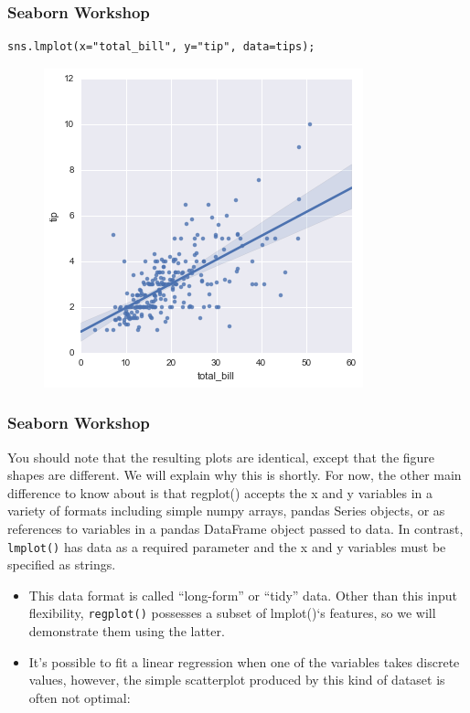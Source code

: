 \documentclass{beamer}
\begin{document}
\begin{frame}[fragile]
	\frametitle{Seaborn Workshop}
	\large
\begin{verbatim}
sns.lmplot(x="total_bill", y="tip", data=tips);
\end{verbatim}
\begin{figure}
	\centering
	\includegraphics[width=0.7\linewidth]{images/regression_10_0}
\end{figure}
\end{frame}
\begin{frame}[fragile]
	\frametitle{Seaborn Workshop}
	\large
You should note that the resulting plots are identical, except that the figure shapes are different. We will explain why this is shortly. For now, the other main difference to know about is that regplot() accepts the x and y variables in a variety of formats including simple numpy arrays, pandas Series objects, or as references to variables in a pandas DataFrame object passed to data. In contrast, \texttt{lmplot()} has data as a required parameter and the x and y variables must be specified as strings. 

\end{frame}
\begin{frame}[fragile]
	\large
	
\begin{itemize}
\item This data format is called “long-form” or “tidy” data. Other than this input flexibility, \texttt{regplot()} possesses a subset of lmplot()‘s features, so we will demonstrate them using the latter.

\item It’s possible to fit a linear regression when one of the variables takes discrete values, however, the simple scatterplot produced by this kind of dataset is often not optimal:
\end{itemize}
\end{frame}
\end{document}
